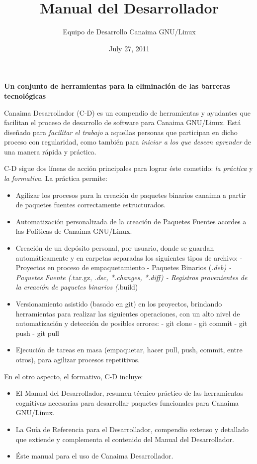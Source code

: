 \documentclass[letterpaper,12pt,spanish]{manual}
\title{Manual del Desarrollador}
\date{July 27, 2011}
\author{Equipo de Desarrollo Canaima GNU/Linux}
\begin{document}
\maketitle
\tableofcontents
\hypertarget{--doc-index}{}


\textbf{Un conjunto de herramientas para la eliminación de las barreras tecnológicas}

Canaima Desarrollador (C-D) es un compendio de herramientas y ayudantes que facilitan el proceso de desarrollo de software para Canaima GNU/Linux. Está diseñado para \emph{facilitar el trabajo} a aquellas personas que participan en dicho proceso con regularidad, como también para \emph{iniciar a los que deseen aprender} de una manera rápida y práctica.

C-D sigue dos líneas de acción principales para lograr éste cometido: \emph{la práctica} y \emph{la formativa}. La práctica permite:
\begin{itemize}
\item {} 
Agilizar los procesos para la creación de paquetes binarios canaima a partir de paquetes fuentes correctamente estructurados.

\item {} 
Automatización personalizada de la creación de Paquetes Fuentes acordes a las Políticas de Canaima GNU/Linux.

\item {} 
Creación de un depósito personal, por usuario, donde se guardan automáticamente y en carpetas separadas los siguientes tipos de archivo:
- Proyectos en proceso de empaquetamiento
- Paquetes Binarios (\emph{.deb)
- Paquetes Fuente (}.tar.gz, \emph{.dsc, *.changes, *.diff)
- Registros provenientes de la creación de paquetes binarios (}.build)

\item {} 
Versionamiento asistido (basado en git) en los proyectos, brindando herramientas para realizar las siguientes operaciones, con un alto nivel de automatización y detección de posibles errores:
- git clone
- git commit
- git push
- git pull

\item {} 
Ejecución de tareas en masa (empaquetar, hacer pull, push, commit, entre otros), para agilizar procesos repetitivos.

\end{itemize}

En el otro aspecto, el formativo, C-D incluye:
\begin{itemize}
\item {} 
El Manual del Desarrollador, resumen técnico-práctico de las herramientas cognitivas necesarias para desarrollar paquetes funcionales para Canaima GNU/Linux.

\item {} 
La Guía de Referencia para el Desarrollador, compendio extenso y detallado que extiende y complementa el contenido del Manual del Desarrollador.

\item {} 
Éste manual para el uso de Canaima Desarrollador.

\end{itemize}
\end{document}
